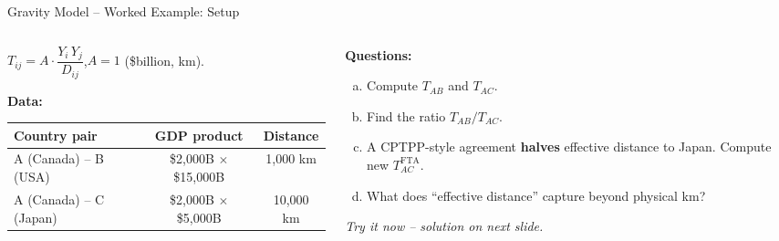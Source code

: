 \documentclass[aspectratio=169]{beamer}
\begin{document}
\begin{frame}{Gravity Model -- Worked Example: Setup}
\begin{columns}[T]
\begin{column}{0.50\textwidth}
\begin{worked}
$T_{ij} = A\cdot\dfrac{Y_i\,Y_j}{D_{ij}}$,\quad $A=1$ (\$billion, km).
\end{worked}
\vspace{0.3em}
\textbf{Data:}
\begin{center}
\begin{adjustbox}{max width=0.95\columnwidth}
\begin{tabular}{lcc}
\toprule
Country pair & GDP product & Distance\\
\midrule
A (Canada) -- B (USA) & \$2{,}000B $\times$ \$15{,}000B & 1{,}000 km\\
A (Canada) -- C (Japan) & \$2{,}000B $\times$ \$5{,}000B & 10{,}000 km\\
\bottomrule
\end{tabular}
\end{adjustbox}
\end{center}


\end{column}
\begin{column}{0.47\textwidth}
\textbf{Questions:}
\begin{enumerate}[(a)]\small
  \item Compute $T_{AB}$ and $T_{AC}$.
  \item Find the ratio $T_{AB}/T_{AC}$.
  \item A CPTPP-style agreement \textbf{halves} effective distance to Japan. Compute new $T_{AC}^{\text{FTA}}$.
  \item What does ``effective distance'' capture beyond physical km?
\end{enumerate}
\vspace{0.3em}
\textit{Try it now -- solution on next slide.}
\end{column}
\end{columns}
\end{frame}
\end{document}
